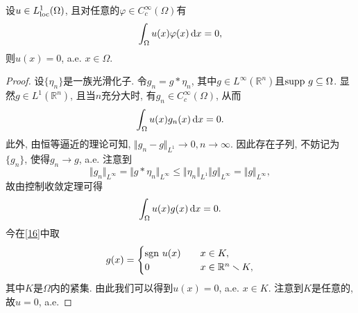 \begin{lemma}
    设$u \in L^1_{{\rm loc}}(\Omega)$, 且对任意的$\varphi \in C_c^{\infty}(\Omega)$有 
    \begin{equation*}
        \int_{\Omega}u(x)\varphi(x) \,{\rm d}x = 0,
    \end{equation*}
    则$u(x) = 0$, a.e. $x \in \Omega$.
    \begin{proof}
        设$\{\eta_n\}$是一族光滑化子. 令$g_n = g \ast \eta_n$, 其中$g \in L^{\infty}(\mathbb{R}^n)$且${\rm supp} \ g \subseteq \Omega$.
        显然$g \in L^1(\mathbb{R}^n)$, 且当$n$充分大时, 有$g_n \in C_c^{\infty}(\Omega)$, 从而
        \begin{equation*}
            \int_{\Omega}u(x)g_n(x) \,{\rm d}x = 0.
        \end{equation*}
        此外, 由恒等逼近的理论可知, $\Vert g_n - g \Vert_{L^1} \rightarrow 0, n \rightarrow \infty$.
        因此存在子列, 不妨记为$\{g_n\}$, 使得$g_n \rightarrow g$, a.e. 注意到 
        \begin{equation*}
            \Vert g_n\Vert_{L^{\infty}} = \Vert g \ast \eta_n \Vert_{L^{\infty}} \leq \Vert \eta_n \Vert_{L^1}\Vert g \Vert_{L^{\infty}} = \Vert g \Vert_{L^{\infty}},
        \end{equation*}
        故由控制收敛定理可得 
        \begin{equation}\label{16}
            \int_{\Omega}u(x)g(x) \,{\rm d}x = 0.
        \end{equation}
        今在\eqref{16}中取 
        \begin{equation*}
            g(x) =  
            \begin{cases} 
                {\rm sgn}\ u(x) \quad &x \in K, \\   
                0 \quad &x \in \mathbb{R}^n \smallsetminus K,  
            \end{cases}
        \end{equation*}
        其中$K$是$\Omega$内的紧集. 由此我们可以得到$u(x) = 0$, a.e. $x \in K$.
        注意到$K$是任意的, 故$u = 0$, a.e.
    \end{proof}
\end{lemma}

